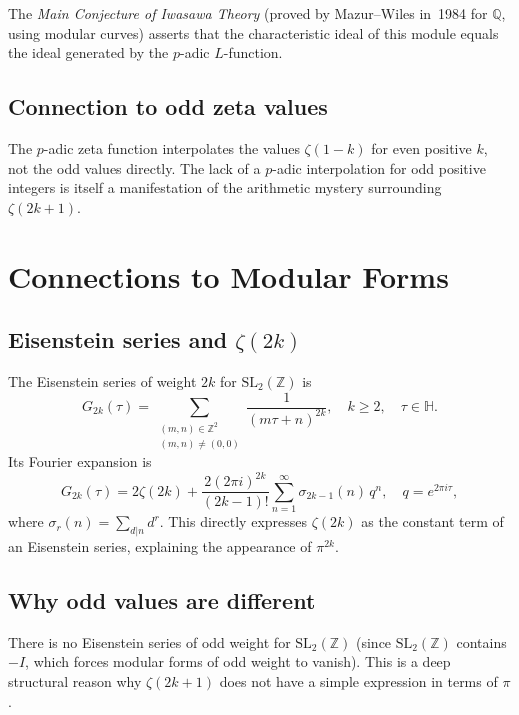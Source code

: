 \documentclass[12pt,a4paper]{amsart}
\theoremstyle{definition}
\theoremstyle{remark}
\begin{document}
The \emph{Main Conjecture of Iwasawa Theory} (proved by Mazur--Wiles in~1984 for
$\mathbb{Q}$, using modular curves) asserts that the characteristic ideal of this
module equals the ideal generated by the $p$-adic $L$-function.

\subsection{Connection to odd zeta values}

The $p$-adic zeta function interpolates the values $\zeta(1-k)$ for even positive
$k$, not the odd values directly. The lack of a $p$-adic interpolation for odd
positive integers is itself a manifestation of the arithmetic mystery surrounding
$\zeta(2k+1)$.

\section{Connections to Modular Forms}

\subsection{Eisenstein series and $\zeta(2k)$}

The Eisenstein series of weight $2k$ for $\mathrm{SL}_2(\mathbb{Z})$ is
\[
  G_{2k}(\tau) = \sum_{\substack{(m,n) \in \mathbb{Z}^2 \\ (m,n) \neq (0,0)}}
  \frac{1}{(m\tau + n)^{2k}}, \quad k \geq 2, \quad \tau \in \mathbb{H}.
\]
Its Fourier expansion is
\[
  G_{2k}(\tau) = 2\zeta(2k) + \frac{2(2\pi i)^{2k}}{(2k-1)!}
  \sum_{n=1}^{\infty} \sigma_{2k-1}(n)\, q^n, \quad q = e^{2\pi i \tau},
\]
where $\sigma_r(n) = \sum_{d|n} d^r$. This directly expresses $\zeta(2k)$ as the
constant term of an Eisenstein series, explaining the appearance of $\pi^{2k}$.

\subsection{Why odd values are different}

There is no Eisenstein series of odd weight for $\mathrm{SL}_2(\mathbb{Z})$
(since $\mathrm{SL}_2(\mathbb{Z})$ contains $-I$, which forces modular forms
of odd weight to vanish). This is a deep structural reason why $\zeta(2k+1)$
does not have a simple expression in terms of $\pi$.
\end{document}
